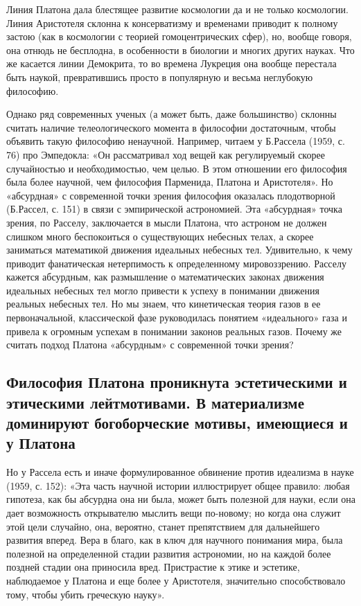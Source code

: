 Линия  Платона  дала блестящее  развитие  космологии  да и  не  только
космологии.  Линия  Аристотеля  склонна к  консерватизму  и  временами
приводит к полному застою (как в космологии с теорией гомоцентрических
сфер), но,  вообще говоря,  она отнюдь не  бесплодна, в  особенности в
биологии и многих  других науках. Что же касается  линии Демокрита, то
во времена  Лукреция она  вообще перестала быть  наукой, превратившись
просто в популярную и весьма неглубокую философию.

Однако ряд современных ученых (а может быть, даже большинство) склонны
считать  наличие  телеологического  момента в  философии  достаточным,
чтобы объявить такую философию ненаучной. Например, читаем у Б.Рассела
(1959,  с.  76)   про  Эмпедокла:  «Он  рассматривал   ход  вещей  как
регулируемый  скорее  случайностью  и  необходимостью,  чем  целью.  В
этом  отношении  его  философия  была  более  научной,  чем  философия
Парменида, Платона  и Аристотеля». Но «абсурдная»  с современной точки
зрения философия оказалась  плодотворной (Б.Рассел, с. 151)  в связи с
эмпирической астрономией.  Эта «абсурдная»  точка зрения,  по Расселу,
заключается  в мысли  Платона, что  астроном не  должен слишком  много
беспокоиться  о  существующих  небесных  телах,  а  скорее  заниматься
математикой  движения  идеальных  небесных тел.  Удивительно,  к  чему
приводит  фанатическая  нетерпимость  к  определенному  мировоззрению.
Расселу кажется  абсурдным, как  размышление о  математических законах
движения идеальных  небесных тел могло  привести к успеху  в понимании
движения реальных небесных  тел. Но мы знаем,  что кинетическая теория
газов  в ее  первоначальной, классической  фазе руководилась  понятием
«идеального» газа  и привела  к огромным  успехам в  понимании законов
реальных  газов.  Почему  же  считать  подход  Платона  «абсурдным»  с
современной точки зрения?

\subsection{Философия  Платона проникнута  эстетическими и  этическими
лейтмотивами.   В   материализме  доминируют   богоборческие   мотивы,
имеющиеся и у Платона}

Но у Рассела есть и иначе формулированное обвинение против идеализма в
науке (1959,  с. 152): «Эта  часть научной истории  иллюстрирует общее
правило:  любая гипотеза,  как бы  абсурдна  она ни  была, может  быть
полезной для науки, если она дает возможность открывателю мыслить вещи
по-новому;  но когда  она служит  этой цели  случайно, она,  вероятно,
станет препятствием для дальнейшего развития вперед. Вера в благо, как
в  ключ для  научного понимания  мира, была  полезной на  определенной
стадии  развития астрономии,  но на  каждой более  поздней стадии  она
приносила вред. Пристрастие к этике  и эстетике, наблюдаемое у Платона
и еще более у Аристотеля, значительно способствовало тому, чтобы убить
греческую науку».

